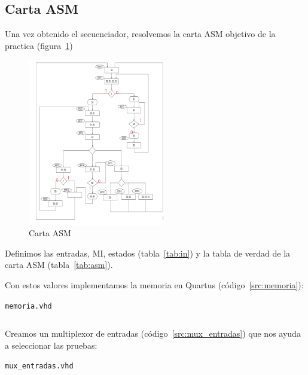\documentclass[table]{scrartcl}
\newenvironment{code}{\captionsetup{type=listing}}{}
\begin{document}
\subsection{Carta ASM}\label{sec:carta-asm}
Una vez obtenido el secuenciador, resolvemos la carta ASM objetivo de la practica
(figura~\ref{fig:dia})
\begin{figure}[H]
  \centering
  \includegraphics[width=0.53\textwidth]{./img/dia}
  \caption{Carta ASM}\label{fig:dia}
\end{figure}

Definimos las entradas, MI, estados (tabla~\ref{tab:in}) y la tabla de verdad de la carta ASM (tabla~\ref{tab:asm}).
\begin{center}
  \scriptsize
  \label{tab:in}
  
\end{center}

\begin{center}
  \tiny
  \label{tab:asm}
  
\end{center}

Con estos valores implementamos la memoria en Quartus
(código~\ref{src:memoria}):
\begin{code}
  \caption{\texttt{memoria.vhd}}\label{src:memoria}
  \inputminted{vhdl}{./memoria.vhd}
\end{code}

Creamos un multiplexor de entradas (código~\ref{src:mux_entradas}) que nos ayuda
a seleccionar las pruebas:
\begin{code}
  \caption{\texttt{mux_entradas.vhd}}\label{src:mux_entradas}
  \inputminted{vhdl}{./mux_entradas.vhd}
\end{code}
\end{document}
